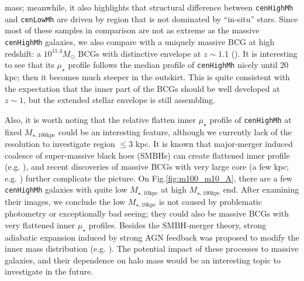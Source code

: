 \documentclass{emulateapj}
\def\rbcg{\texttt{cenHighMh}}
\def\nbcg{\texttt{cenLowMh}}
\def\minn{{$M_{\star,10\mathrm{kpc}}$}}
\def\mtot{{$M_{\star,100\mathrm{kpc}}$}}
\def\mden{{$\mu_{\star}$}}
\begin{document}
\begin{CJK*}{UTF8}{gbsn}
    mass; meanwhile, it also highlights that structural difference between \rbcg{} and 
    \nbcg{} are driven by region that is not dominated by ``in-situ'' stars. 
    Since most of these samples in comparison are not as extreme as the massive 
    \rbcg{} galaxies, we also compare with a uniquely massive BCG at high redshift: 
    a $10^{11.4} M_{\odot}$ BCGs with distinctive envelope at $z\sim 1.1$ 
    (\citealt{Liu2013}).  
    It is interesting to see that its \mden{} profile follows the median profile of 
    \rbcg{} nicely until 20 kpc; then it becomes much steeper in the outskirt.  
    This is quite consistent with the expectation that the inner part of the BCGs 
    should be well developed at $z\sim 1$, but the extended stellar envelope is still 
    assembling.  
    
    Also, it is worth noting that the relative flatten inner \mden{} profile of \rbcg{}
    at fixed \mtot{} could be an interesting feature, although we currently lack of the 
    resolution to investigate region $\leq 3$ kpc.  
    It is known that major-merger induced coalesce of super-massive black hoes (SMBHs)
    can create flattened inner profile (e.g. \citealt{Milosavljvi2002}), and recent 
    discoveries of massive BCGs with very large core 
    (a few kpc; e.g. \citealt{Postman2012, LopezCruz2014}) further complicate the picture.
    On Fig.\ref{fig:m100_m10_A}, there are a few \rbcg{} galaxies with quite low 
    \minn{} at high \mtot{} end. 
    After examining their images, we conclude the low \minn{} is not caused by problematic
    photometry or exceptionally bad seeing; they could also be massive BCGs with very 
    flattened inner \mden{} profiles.  
    Besides the SMBH-merger theory, strong adiabatic expansion induced by strong AGN 
    feedback was proposed to modify the inner mass distribution (e.g. \citealt{Fan2008}). 
    The potential impact of these processes to massive galaxies, and their dependence on 
    halo mass would be an interesting topic to investigate in the future.  
    

\end{CJK*}
\end{document}
